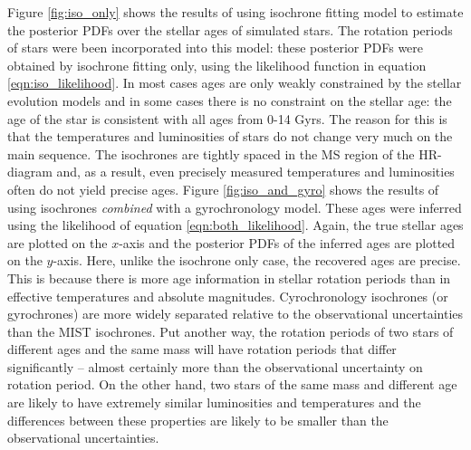 Figure \ref{fig:iso_only} shows the results of using isochrone fitting
model to estimate the posterior PDFs over the stellar ages of simulated stars.
The rotation periods of stars were been incorporated into this model: these
posterior PDFs were obtained by isochrone fitting only, using the likelihood
function in equation \ref{eqn:iso_likelihood}.
In most cases ages are only weakly constrained by the stellar evolution models
and in some cases there is no constraint on the stellar age: the age of the
star is consistent with all ages from 0-14 Gyrs.
The reason for this is that the temperatures and luminosities of stars do not
change very much on the main sequence.
The isochrones are tightly spaced in the MS region of the HR-diagram and, as a
result, even precisely measured temperatures and luminosities often do not
yield precise ages.
Figure \ref{fig:iso_and_gyro} shows the results of using isochrones {\it
combined} with a gyrochronology model.
These ages were inferred using the likelihood of equation
\ref{eqn:both_likelihood}.
Again, the true stellar ages are plotted on the $x$-axis and the posterior
PDFs of the inferred ages are plotted on the $y$-axis.
Here, unlike the isochrone only case, the recovered ages are precise.
This is because there is more age information in stellar rotation periods than
in effective temperatures and absolute magnitudes.
Cyrochronology isochrones (or gyrochrones) are more widely separated relative
to the observational uncertainties than the MIST isochrones.
Put another way, the rotation periods of two stars of different ages and the
same mass will have rotation periods that differ significantly -- almost
certainly more than the observational uncertainty on rotation period.
On the other hand, two stars of the same mass and different age are likely to
have extremely similar luminosities and temperatures and the differences
between these properties are likely to be smaller than the observational
uncertainties.

